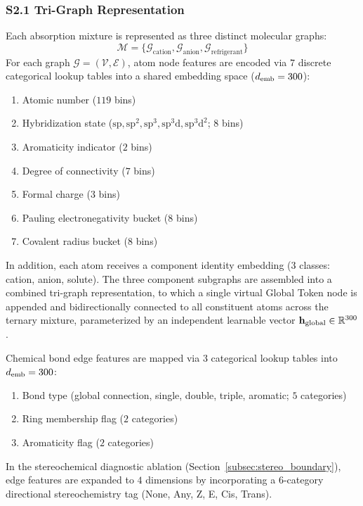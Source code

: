 \subsubsection*{S2.1 Tri-Graph Representation}
Each absorption mixture is represented as three distinct molecular graphs:
\begin{equation}
\mathcal{M} = \{\mathcal{G}_{\mathrm{cation}}, \mathcal{G}_{\mathrm{anion}}, \mathcal{G}_{\mathrm{refrigerant}}\}
\end{equation}
For each graph $\mathcal{G} = (\mathcal{V}, \mathcal{E})$, atom node features are encoded via $7$ discrete categorical lookup tables into a shared embedding space ($d_{\rm emb} = 300$):
\begin{enumerate}
    \item Atomic number ($119$ bins)
    \item Hybridization state ($\text{sp}, \text{sp}^2, \text{sp}^3, \text{sp}^3\text{d}, \text{sp}^3\text{d}^2$; $8$ bins)
    \item Aromaticity indicator ($2$ bins)
    \item Degree of connectivity ($7$ bins)
    \item Formal charge ($3$ bins)
    \item Pauling electronegativity bucket ($8$ bins)
    \item Covalent radius bucket ($8$ bins)
\end{enumerate}
In addition, each atom receives a component identity embedding ($3$ classes: cation, anion, solute). The three component subgraphs are assembled into a combined tri-graph representation, to which a single virtual Global Token node is appended and bidirectionally connected to all constituent atoms across the ternary mixture, parameterized by an independent learnable vector $\mathbf{h}_{\rm global} \in \mathbb{R}^{300}$.

Chemical bond edge features are mapped via $3$ categorical lookup tables into $d_{\rm emb} = 300$:
\begin{enumerate}
    \item Bond type (global connection, single, double, triple, aromatic; $5$ categories)
    \item Ring membership flag ($2$ categories)
    \item Aromaticity flag ($2$ categories)
\end{enumerate}
In the stereochemical diagnostic ablation (Section~\ref{subsec:stereo_boundary}), edge features are expanded to $4$ dimensions by incorporating a $6$-category directional stereochemistry tag (None, Any, Z, E, Cis, Trans).

